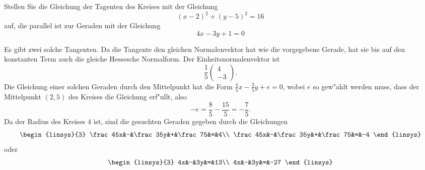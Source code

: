 Stellen Sie die Gleichung der Tagenten des Kreises mit der Gleichung
\[
(x-2)^2+(y-5)^2=16
\]
auf, die parallel ist zur Geraden mit der Gleichung
\[
4x-3y+1=0
\]

\begin{loesung}
Es gibt zwei solche Tangenten. Da die Tangente den gleichen Normalenvektor
hat wie die vorgegebene Gerade, hat sie bis auf den konstanten Term
auch die gleiche Hessesche Normalform. Der Einheitsnormalenvektor
ist
\[
\frac15\begin{pmatrix}4\\-3\end{pmatrix}.
\]
Die Gleichung einer solchen Geraden durch den Mittelpunkt hat
die Form $\frac45x-\frac35y+e=0$, wobei $e$ so gew"ahlt werden
muss, dass der Mittelpunkt $(2,5)$ des Kreises die Gleichung
erf"ullt, also
\[
-e=\frac85-\frac{15}5=-\frac75.
\]
Da der Radius des Kreises $4$ ist, sind die gesuchten Geraden gegeben
durch die Gleichungen
\[
\begin{linsys}{3}
\frac45x&-&\frac35y&+&\frac75&=&4\\
\frac45x&-&\frac35y&+&\frac75&=&-4
\end{linsys}
\]
oder
\[
\begin{linsys}{3}
4x&-&3y&=&13\\
4x&-&3y&=&-27
\end{linsys}
\]
\end{loesung}
